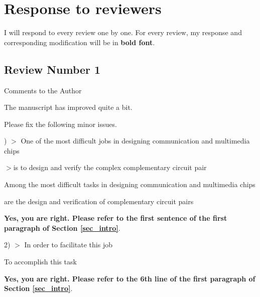 \documentclass[journal]{IEEEtran}
\begin{document}
{%





\section{Response to reviewers}
I will respond to every review one by one.
For every review,
my response and corresponding modification will be in \textbf{bold font}.

\subsection{Review Number 1}

Comments to the Author

The manuscript has improved quite a bit.

Please fix the following minor issues.

) $>$ One of the most difficult jobs in designing communication and multimedia chips

$>$is to design and verify the complex complementary circuit pair

  Among the most difficult tasks in designing communication and multimedia chips

  are the design and verification of complementary circuit pairs

\smallskip
\textbf{Yes,
you are right.
Please refer to the first sentence of the first paragraph of Section  \ref{sec_intro}}.

\bigskip

2) $>$ In order to facilitate this job

  To accomplish this task

\smallskip
\textbf{Yes,
you are right.
Please refer to the 6th line of the first paragraph of Section  \ref{sec_intro}}.

}
\end{document}
